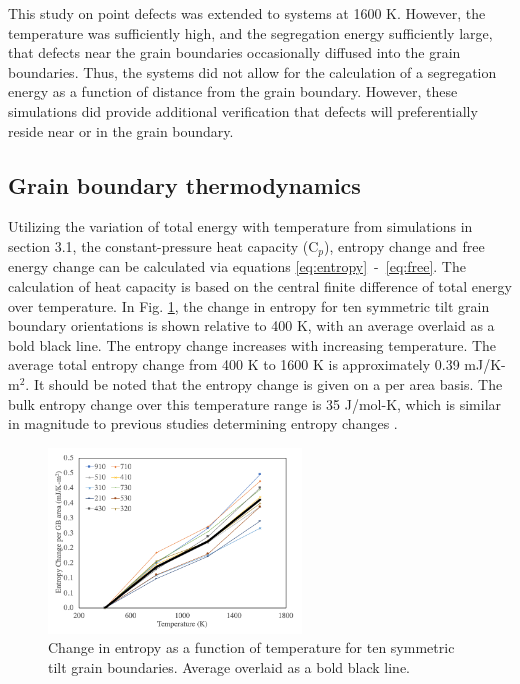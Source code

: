 \documentclass[review]{elsarticle}
\begin{document}
\FloatBarrier

This study on point defects was extended to systems at 1600 K. However, the temperature was sufficiently high, and the segregation energy sufficiently large, that defects near the grain boundaries occasionally diffused into the grain boundaries. Thus, the systems did not allow for the calculation of a segregation energy as a function of distance from the grain boundary. However, these simulations did provide additional verification that defects will preferentially reside near or in the grain boundary. 

\FloatBarrier

\subsection{Grain boundary thermodynamics}

Utilizing the variation of total energy with temperature from simulations in section 3.1, the constant-pressure heat capacity (C$_{p}$), entropy change and free energy change can be calculated via equations \ref{eq:entropy}~-~\ref{eq:free}. The calculation of heat capacity is based on the central finite difference of total energy over temperature. In Fig. \ref{fig:entropy}, the change in entropy for ten symmetric tilt grain boundary orientations is shown relative to 400 K, with an average overlaid as a bold black line. The entropy change increases with increasing temperature. The average total entropy change from 400 K to 1600 K is approximately 0.39 mJ/K-m$^{2}$. It should be noted that the entropy change is given on a per area basis. The bulk entropy change over this temperature range is 35 J/mol-K, which is similar in magnitude to previous studies determining entropy changes \cite{mcnutt2014, peter2004}. 

\begin{figure}[h]
 \centering
 \includegraphics[width=0.6\textwidth]{entropy.png} 
 \caption{Change in entropy as a function of temperature for ten symmetric tilt grain boundaries. Average overlaid as a bold black line. }
 \label{fig:entropy}
\end{figure}
\end{document}
